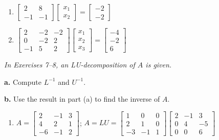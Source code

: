 \documentclass{article}
\begin{document}
\begin{enumerate}
  \item[3.] $\begin{bmatrix}2&8\\-1&-1\end{bmatrix}
             \begin{bmatrix}x_1\\x_2\end{bmatrix}
             = \begin{bmatrix}-2\\-2\end{bmatrix}$

  \item[5.] $\begin{bmatrix}2&-2&-2\\0&-2&2\\-1&5&2\end{bmatrix}
             \begin{bmatrix}x_1\\x_2\\x_3\end{bmatrix}
             = \begin{bmatrix}-4\\-2\\6\end{bmatrix}$

\end{enumerate}

\noindent\textit{In Exercises 7--8, an LU-decomposition of $A$ is given.}

\textbf{a.} Compute $L^{-1}$ and $U^{-1}$.

\textbf{b.} Use the result in part (a) to find the inverse of $A$.

\begin{enumerate}
  \item[7.] $A = \begin{bmatrix}2&-1&3\\4&2&1\\-6&-1&2\end{bmatrix}$;\quad
        $A = LU = \begin{bmatrix}1&0&0\\2&1&0\\-3&-1&1\end{bmatrix}
                  \begin{bmatrix}2&-1&3\\0&4&-5\\0&0&6\end{bmatrix}$

\end{enumerate}
\end{document}
